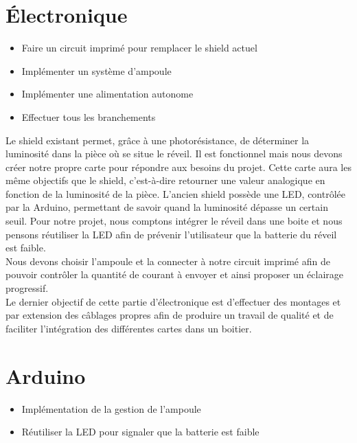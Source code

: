 \section{Électronique} %
\label{sec:_lectronique}

\begin{itemize}
	\item Faire un circuit imprimé pour remplacer le shield actuel
	\item Implémenter un système d'ampoule
	\item Implémenter une alimentation autonome
	\item Effectuer tous les branchements 
\end{itemize}
\vspace{20px}

Le shield existant permet, grâce à une photorésistance, de déterminer la luminosité dans la pièce où se situe le réveil. Il est fonctionnel mais nous devons créer notre propre carte pour répondre aux besoins du projet. Cette carte aura les même objectifs que le shield, c'est-à-dire retourner une valeur analogique en fonction de la luminosité de la pièce. L'ancien shield possède une LED, contrôlée par la Arduino, permettant de savoir quand la luminosité dépasse un certain seuil. Pour notre projet, nous comptons intégrer le réveil dans une boite et nous pensons réutiliser la LED afin de prévenir l'utilisateur que la batterie du réveil est faible. \\

Nous devons choisir l'ampoule et la connecter à notre circuit imprimé afin de pouvoir contrôler la quantité de courant à envoyer et ainsi proposer un éclairage progressif. \\

Le dernier objectif de cette partie d'électronique est d'effectuer des montages et par extension des câblages propres afin de produire un travail de qualité et de faciliter l'intégration des différentes cartes dans un boitier. \\


\section{Arduino} %
\label{sec:arduino}

\begin{itemize}
	\item Implémentation de la gestion de l'ampoule
	\item Réutiliser la LED pour signaler que la batterie est faible 
\end{itemize}
\vspace{20px}

